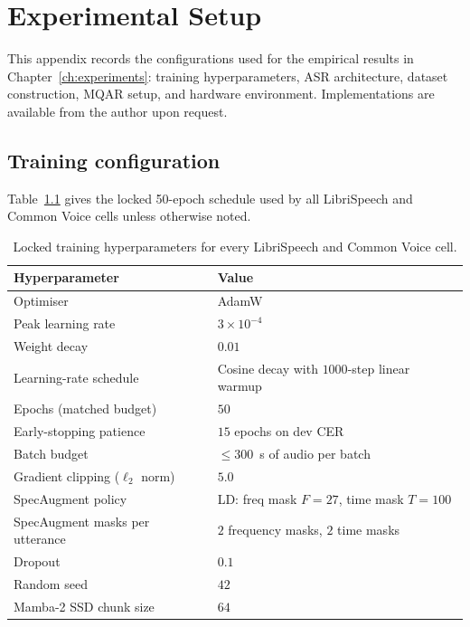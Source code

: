 \chapter{Experimental Setup}\label{app:experimental-setup}

This appendix records the configurations used for the empirical
results in Chapter~\ref{ch:experiments}: training hyperparameters,
ASR architecture, dataset construction, MQAR setup, and hardware
environment. Implementations are available from the author upon
request.

\section{Training configuration}\label{app:setup:training}

Table~\ref{tab:setup:hyperparams} gives the locked 50-epoch
schedule used by all LibriSpeech and Common Voice cells unless
otherwise noted.

\begin{table}[!htbp]
\centering
\small
\caption[Training hyperparameters]{Locked training
hyperparameters for every LibriSpeech and Common Voice cell.}
\label{tab:setup:hyperparams}
\setlength{\tabcolsep}{6pt}
\renewcommand{\arraystretch}{1.15}
\begin{tabularx}{\linewidth}{@{}p{4.5cm} X@{}}
\toprule
\textbf{Hyperparameter} & \textbf{Value} \\
\midrule
Optimiser & AdamW \\
Peak learning rate & $3 \times 10^{-4}$ \\
Weight decay & $0.01$ \\
Learning-rate schedule & Cosine decay with $1000$-step linear warmup \\
Epochs (matched budget) & $50$ \\
Early-stopping patience & $15$ epochs on dev CER \\
Batch budget & $\le 300$~s of audio per batch \\
Gradient clipping ($\ell_{2}$ norm) & $5.0$ \\
SpecAugment policy & LD: freq mask $F = 27$, time mask $T = 100$ \\
SpecAugment masks per utterance & $2$ frequency masks, $2$ time masks \\
Dropout & $0.1$ \\
Random seed & $42$ \\
Mamba-2 SSD chunk size & $64$ \\
\bottomrule
\end{tabularx}
\end{table}

